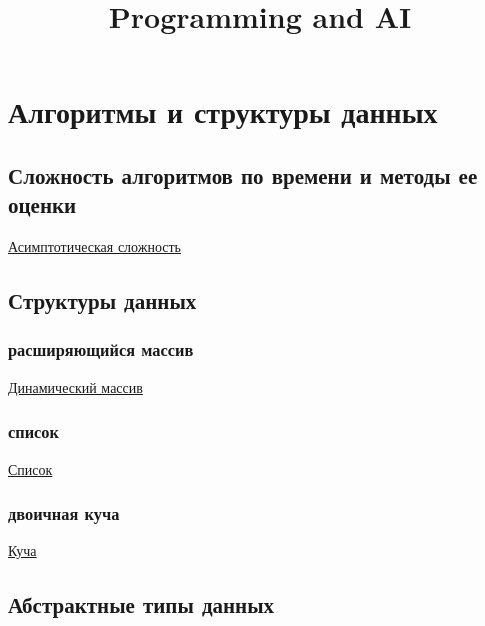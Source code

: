 \documentclass{article}
\title{Programming and AI} %
\begin{document}
	
\maketitle %
\section{Алгоритмы и структуры данных}

\subsection{Сложность алгоритмов по времени и методы ее оценки}

\href{https://ru.wikipedia.org/wiki/%D0%92%D1%8B%D1%87%D0%B8%D1%81%D0%BB%D0%B8%D1%82%D0%B5%D0%BB%D1%8C%D0%BD%D0%B0%D1%8F_%D1%81%D0%BB%D0%BE%D0%B6%D0%BD%D0%BE%D1%81%D1%82%D1%8C}{Асимптотическая сложность}


\subsection{Структуры данных}

\subsubsection{расширяющийся массив}

\href{https://ru.algorithmica.org/cs/basic-structures/vector/}{Динамический массив}

\subsubsection{список}

\href{https://neerc.ifmo.ru/wiki/index.php?title=%D0%A1%D0%BF%D0%B8%D1%81%D0%BE%D0%BA#:~:text=List)%20%E2%80%94%20%D1%81%D1%82%D1%80%D1%83%D0%BA%D1%82%D1%83%D1%80%D0%B0%20%D0%B4%D0%B0%D0%BD%D0%BD%D1%8B%D1%85%2C%20%D1%81%D0%BE%D1%81%D1%82%D0%BE%D1%8F%D1%89%D0%B0%D1%8F,%D0%B4%D0%B0%D0%BD%D0%BD%D1%8B%D1%85%20%D0%BA%D0%B0%D0%BA%20%D1%81%D1%82%D0%B5%D0%BA%20%D0%B8%20%D0%BE%D1%87%D0%B5%D1%80%D0%B5%D0%B4%D1%8C}{Список}
\subsubsection{двоичная куча}

\href{https://ru.algorithmica.org/cs/basic-structures/vector/}{Куча}

\subsection{Абстрактные типы данных}
\end{document}
